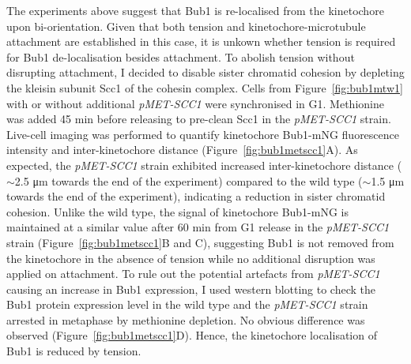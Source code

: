 The experiments above suggest that Bub1 is re-localised from the kinetochore upon bi-orientation. Given that both tension and kinetochore-microtubule attachment are established in this case, it is unkown whether tension is required for Bub1 de-localisation besides attachment. To abolish tension without disrupting attachment, I decided to disable sister chromatid cohesion by depleting the kleisin subunit Scc1 of the cohesin complex. Cells from Figure~\ref{fig:bub1mtw1} with or without additional \textit{pMET-SCC1} were synchronised in G1. Methionine was added 45 \si{\minute} before releasing to pre-clean Scc1 in the \textit{pMET-SCC1} strain. Live-cell imaging was performed to quantify kinetochore Bub1-mNG fluorescence intensity and inter-kinetochore distance (Figure~\ref{fig:bub1metscc1}A). As expected, the \textit{pMET-SCC1} strain exhibited increased inter-kinetochore distance ($\sim$2.5 \si{\micro\metre} towards the end of the experiment) compared to the wild type ($\sim$1.5 \si{\micro\metre} towards the end of the experiment), indicating a reduction in sister chromatid cohesion. Unlike the wild type, the signal of kinetochore Bub1-mNG is maintained at a similar value after 60 \si{\minute} from G1 release in the \textit{pMET-SCC1} strain (Figure~\ref{fig:bub1metscc1}B and C), suggesting Bub1 is not removed from the kinetochore in the absence of tension while no additional disruption was applied on attachment. To rule out the potential artefacts from \textit{pMET-SCC1} causing an increase in Bub1 expression, I used western blotting to check the Bub1 protein expression level in the wild type and the \textit{pMET-SCC1} strain arrested in metaphase by methionine depletion. No obvious difference was observed (Figure~\ref{fig:bub1metscc1}D). Hence, the kinetochore localisation of Bub1 is reduced by tension. 

